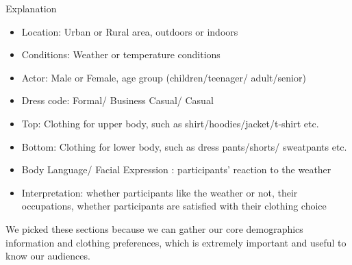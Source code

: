 \documentclass{sigchi}
\begin{document}
Explanation
\begin{itemize}
    \item Location: Urban or Rural area, outdoors or indoors
    \item Conditions: Weather or temperature conditions
    \item Actor: Male or Female, age group (children/teenager/ adult/senior)
    \item Dress code: Formal/ Business Casual/ Casual
    \item Top: Clothing for upper body, such as shirt/hoodies/jacket/t-shirt etc.
    \item Bottom: Clothing for lower body, such as dress pants/shorts/ sweatpants etc.
    \item Body Language/ Facial Expression : participants' reaction to the weather
    \item Interpretation: whether participants like the weather or not, their occupations, whether participants are satisfied with their clothing choice
\end{itemize}

We picked these sections because we can gather our core demographics information and clothing preferences, which is extremely important and useful to know our audiences.

\iffalse
\section{References Format}
Your references should be published materials accessible to the
public. 



\fi
\end{document}
